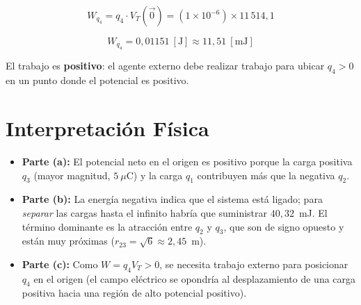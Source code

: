 \documentclass[12pt,letterpaper]{article}
\begin{document}
\[
    W_{q_4} = q_4 \cdot V_T(\vec{0}) = (1\times10^{-6}) \times 11\,514{,}1
\]

\[
    \boxed{W_{q_4} = 0{,}01151\ [\text{J}] \approx 11{,}51\ [\text{mJ}]}
\]

\noindent El trabajo es \textbf{positivo}: el agente externo debe realizar trabajo para ubicar $q_4 > 0$ en un punto donde el potencial es positivo.

\section*{Interpretaci\'on F\'isica}

\begin{itemize}
    \item \textbf{Parte (a):} El potencial neto en el origen es positivo porque la carga positiva $q_3$ (mayor magnitud, $5\ \mu\text{C}$) y la carga $q_1$ contribuyen m\'as que la negativa $q_2$.
    \item \textbf{Parte (b):} La energ\'ia negativa indica que el sistema est\'a ligado; para \emph{separar} las cargas hasta el infinito habr\'ia que suministrar $40{,}32$~mJ. El t\'ermino dominante es la atracci\'on entre $q_2$ y $q_3$, que son de signo opuesto y est\'an muy pr\'oximas ($r_{23} = \sqrt{6}\approx 2{,}45$~m).
    \item \textbf{Parte (c):} Como $W = q_4 V_T > 0$, se necesita trabajo externo para posicionar $q_4$ en el origen (el campo el\'ectrico se opondr\'ia al desplazamiento de una carga positiva hacia una regi\'on de alto potencial positivo).
\end{itemize}
\end{document}
